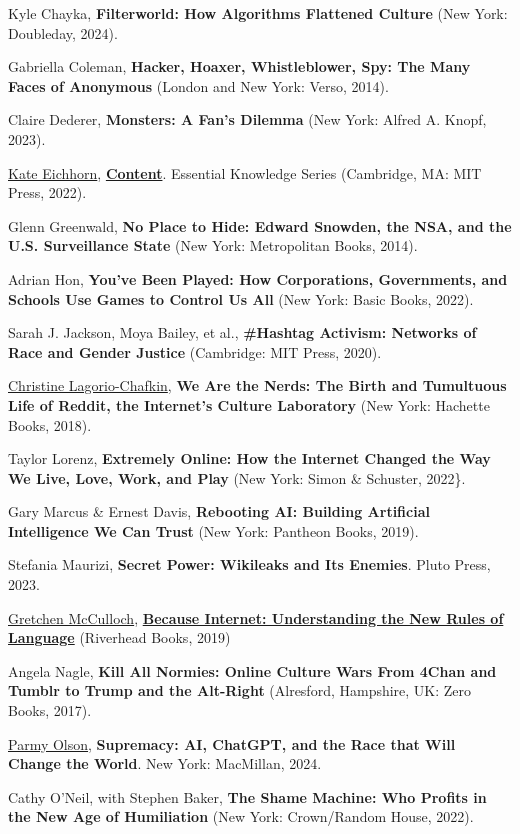 \documentclass[
  letterpaper,
  DIV=11,
  numbers=noendperiod,
  oneside]{scrartcl}
\begin{document}
Kyle Chayka, \textbf{Filterworld: How Algorithms Flattened Culture} (New
York: Doubleday, 2024).

Gabriella Coleman, \textbf{Hacker, Hoaxer, Whistleblower, Spy: The Many
Faces of Anonymous} (London and New York: Verso, 2014).

Claire Dederer, \textbf{Monsters: A Fan's Dilemma} (New York: Alfred A.
Knopf, 2023).

\href{https://emerson.edu/faculty-staff-directory/kate-eichhorn}{Kate
Eichhorn},
\href{https://mitpress.mit.edu/9780262543286/content/}{\textbf{Content}}.
Essential Knowledge Series (Cambridge, MA: MIT Press, 2022).

Glenn Greenwald, \textbf{No Place to Hide: Edward Snowden, the NSA, and
the U.S. Surveillance State} (New York: Metropolitan Books, 2014).

Adrian Hon, \textbf{You've Been Played: How Corporations, Governments,
and Schools Use Games to Control Us All} (New York: Basic Books, 2022).

Sarah J. Jackson, Moya Bailey, et al., \textbf{\#Hashtag Activism:
Networks of Race and Gender Justice} (Cambridge: MIT Press, 2020).

\href{https://x.com/lagorio}{Christine Lagorio-Chafkin}, \textbf{We Are
the Nerds: The Birth and Tumultuous Life of Reddit, the Internet's
Culture Laboratory} (New York: Hachette Books, 2018).

Taylor Lorenz, \textbf{Extremely Online: How the Internet Changed the
Way We Live, Love, Work, and Play} (New York: Simon \& Schuster, 2022\}.

Gary Marcus \& Ernest Davis, \textbf{Rebooting AI: Building Artificial
Intelligence We Can Trust} (New York: Pantheon Books, 2019).

Stefania Maurizi, \textbf{Secret Power: Wikileaks and Its Enemies}.
Pluto Press, 2023.

\href{https://gretchenmcculloch.com/}{Gretchen McCulloch},
\href{https://gretchenmcculloch.com/book/}{\textbf{Because Internet:
Understanding the New Rules of Language}} (Riverhead Books, 2019)

Angela Nagle, \textbf{Kill All Normies: Online Culture Wars From 4Chan
and Tumblr to Trump and the Alt-Right} (Alresford, Hampshire, UK: Zero
Books, 2017).

\href{https://x.com/parmy}{Parmy Olson}, \textbf{Supremacy: AI, ChatGPT,
and the Race that Will Change the World}. New York: MacMillan, 2024.

Cathy O'Neil, with Stephen Baker, \textbf{The Shame Machine: Who Profits
in the New Age of Humiliation} (New York: Crown/Random House, 2022).
\end{document}
